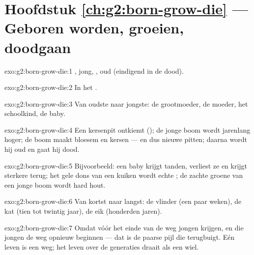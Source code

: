 \section*{Hoofdstuk \ref{ch:g2:born-grow-die} --- Geboren worden, groeien, doodgaan}

\begin{solution}{exo:g2:born-grow-die:1}
, jong, , oud (eindigend in de dood).
\end{solution}

\begin{solution}{exo:g2:born-grow-die:2}
In het  .
\end{solution}

\begin{solution}{exo:g2:born-grow-die:3}
Van oudste naar jongste: de grootmoeder, de moeder, het schoolkind, de
baby.
\end{solution}

\begin{solution}{exo:g2:born-grow-die:4}
Een kersenpit ontkiemt (); de jonge boom wordt jarenlang hoger;
de  boom maakt bloesem en kersen --- en dus nieuwe pitten;
daarna wordt hij oud en gaat hij dood.
\end{solution}

\begin{solution}{exo:g2:born-grow-die:5}
Bijvoorbeeld: een baby krijgt tanden, verliest ze en krijgt sterkere
terug; het gele dons van een kuiken wordt echte ; de zachte groene
 van een jonge boom wordt hard hout.
\end{solution}

\begin{solution}{exo:g2:born-grow-die:6}
Van kortst naar langst: de vlinder (een paar weken), de kat (tien tot
twintig jaar), de eik (honderden jaren).
\end{solution}

\begin{solution}{exo:g2:born-grow-die:7}
Omdat  vóór het einde van de weg jongen krijgen, en die
jongen de weg opnieuw beginnen --- dat is de paarse pijl die terugbuigt.
Eén leven is een weg; het leven over de generaties draait als een wiel.
\end{solution}

